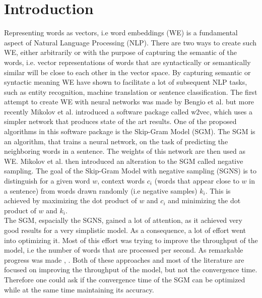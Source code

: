 \section{Introduction}\label{sec:introduction}

Representing words as vectors, i.e word embeddings (WE) is a fundamental aspect of Natural Language Processing (NLP). There are two ways to create such WE, either arbitrarily or with the purpose of capturing the semantic  of the words, i.e. vector representations of words that are syntactically or semantically similar will be close to each other in the vector space. By capturing semantic or syntactic meaning WE have shown to facilitate a lot of subsequent NLP tasks, such as entity recognition, machine translation or sentence classification. 
The first attempt to create WE with neural networks was made by Bengio et al. \citep{bengio} but more recently Mikolov et al. \citep{mikolov} introduced a software package called w2vec, which uses a simpler network that produces state of the art results. One of the proposed algorithms in this software package is the Skip-Gram Model (SGM). The SGM is an algorithm, that trains a neural network, on the task of predicting the neighboring words in a sentence. The weights of this network are then used as WE. Mikolov et al. \citep{mikolov2} then introduced an alteration to the SGM called negative sampling. The goal of the Skip-Gram Model with negative sampling (SGNS) is to distinguish for a given word $w$, context words $c_i$ (words that appear close to $w$ in a sentence) from words drawn randomly (i.e negative samples) $k_i$. This is achieved by maximizing the dot product of $w$ and $c_i$ and minimizing the dot product of $w$ and $k_i$.\\
The SGM, espacially the SGNS, gained a lot of attention, as it achieved very good results for a very simplistic model. As a consequence, a lot of effort went into optimizing it. Most of this effort was trying to improve the throughput of the model, i.e the number of words that are processed per second. As remarkable progress was made \citep{intel} , \citep{gpu}.  Both of these approaches and most of the literature are focused on improving the throughput of the model, but not the convergence time.  Therefore one could ask if the convergence time of the SGM can be optimized while at the same time maintaining its accuracy.\\
